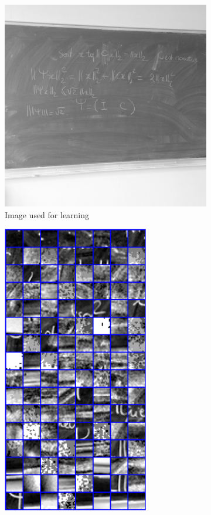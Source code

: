 \begin{figure}[!ht]\centering
\begin{subfigure}[b]{0.40\textwidth}\centering
	\includegraphics[width=\textwidth]{figures/ksvd/tableau_512x512.png}
	\caption{Image used for learning}\label{fig_ksvd_image}
\end{subfigure}
\begin{subfigure}[b]{0.29\textwidth}\centering
	\includegraphics[width=0.7\textwidth]{figures/ksvd/patches.pdf}

\end{subfigure}
\end{figure}
